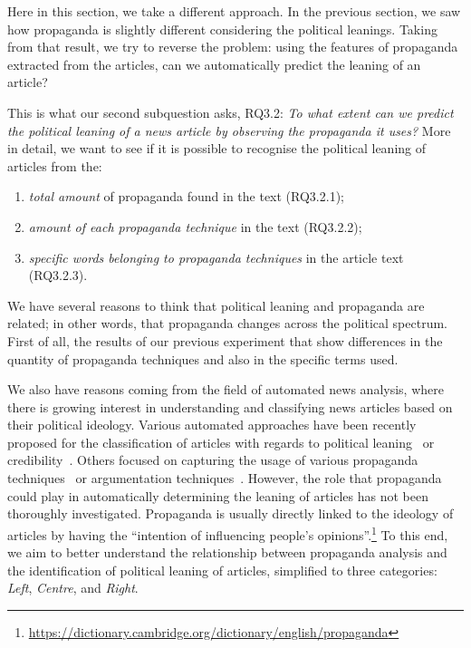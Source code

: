 Here in this section, we take a different approach.
In the previous section, we saw how propaganda is slightly different considering the political leanings.
Taking from that result, we try to reverse the problem: using the features of propaganda extracted from the articles, can we automatically predict the leaning of an article?

This is what our second subquestion asks, RQ3.2: \emph{To what extent can we predict the political leaning of a news article by observing the propaganda it uses?}
More in detail, we want to see if it is possible to recognise the political leaning of articles from the:
\begin{enumerate}
    \item \emph{total amount} of propaganda found in the text (RQ3.2.1);
    \item \emph{amount of each propaganda technique} in the text (RQ3.2.2);
    \item \emph{specific words belonging to propaganda techniques} in the article text (RQ3.2.3).
\end{enumerate}


We have several reasons to think that political leaning and propaganda are related; in other words, that propaganda changes across the political spectrum.
First of all, the results of our previous experiment that show differences in the quantity of propaganda techniques and also in the specific terms used.

We also have reasons coming from the field of automated news analysis, where there is growing interest in understanding and classifying news articles based on their political ideology.
Various automated approaches have been recently proposed for the classification of articles with regards to political leaning~\cite{baly2020we} or credibility~\cite{horne2018assessing}. Others focused on capturing the usage of various propaganda techniques~\cite{da2019fine} or argumentation techniques~\cite{lippi2016argumentation}. However, the role that propaganda could play in automatically determining the leaning of articles has not been thoroughly investigated.
Propaganda is usually directly linked to the ideology of articles by having the ``intention of influencing people's opinions''.\footnote{\url{https://dictionary.cambridge.org/dictionary/english/propaganda}} To this end, we aim to better understand the relationship between propaganda analysis and the identification of political leaning of articles, simplified to three categories: \textit{Left}, \textit{Centre}, and \textit{Right}.

